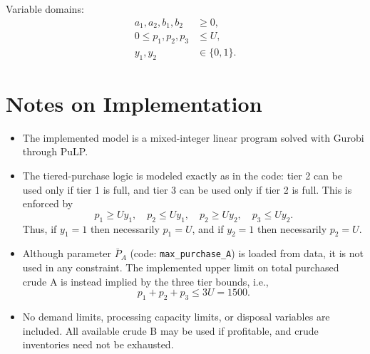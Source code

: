 Variable domains:
\begin{align}
a_1,a_2,b_1,b_2 &\ge 0, \\
0 \le p_1,p_2,p_3 &\le U, \\
y_1,y_2 &\in \{0,1\}.
\end{align}

\section*{Notes on Implementation}

\begin{itemize}
    \item The implemented model is a mixed-integer linear program solved with Gurobi through PuLP.
    \item The tiered-purchase logic is modeled exactly as in the code: tier 2 can be used only if tier 1 is full, and tier 3 can be used only if tier 2 is full. This is enforced by
    \[
    p_1 \ge U y_1,\quad p_2 \le U y_1,\quad
    p_2 \ge U y_2,\quad p_3 \le U y_2.
    \]
    Thus, if $y_1=1$ then necessarily $p_1=U$, and if $y_2=1$ then necessarily $p_2=U$.
    \item Although parameter $\bar P_A$ (code: \texttt{max\_purchase\_A}) is loaded from data, it is not used in any constraint. The implemented upper limit on total purchased crude A is instead implied by the three tier bounds, i.e.,
    \[
    p_1+p_2+p_3 \le 3U = 1500.
    \]
    \item No demand limits, processing capacity limits, or disposal variables are included. All available crude B may be used if profitable, and crude inventories need not be exhausted.
\end{itemize}
